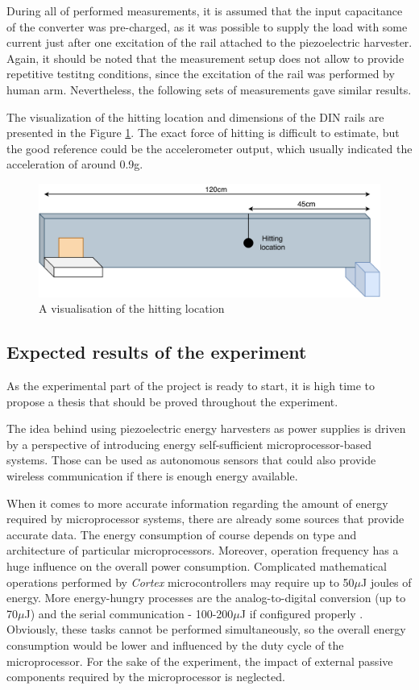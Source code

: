 \documentclass[12pt,a4paper]{article}
\begin{document}
During all of performed measurements, it is assumed that the input capacitance of the converter was pre-charged, as it was possible to supply the load with some current just after one excitation of the rail attached to the piezoelectric harvester. Again, it should be noted that the measurement setup does not allow to provide repetitive testitng conditions, since the excitation of the rail was performed by human arm. Nevertheless, the following sets of measurements gave similar results.
\par
The visualization of the hitting location and dimensions of the DIN rails are presented in the Figure \ref{fig:dinrail}. The exact force of hitting is difficult to estimate, but the good reference could be the accelerometer output, which usually indicated the acceleration of around 0.9g.

\begin{figure}[ht!]
\includegraphics[scale=0.55]{dinrail.pdf}
\caption{A visualisation of the hitting location}
\label{fig:dinrail}
\end{figure}

\subsection{Expected results of the experiment}
As the experimental part of the project is ready to start, it is high time to propose a thesis that should be proved throughout the experiment.
\par
The idea behind using piezoelectric energy harvesters as power supplies is driven by a perspective of introducing energy self-sufficient microprocessor-based systems. Those can be used as autonomous sensors that could also provide wireless communication if there is enough energy available.
\par
When it comes to more accurate information regarding the amount of energy required by microprocessor systems, there are already some sources \cite{joules} that provide accurate data. The energy consumption of course depends on type and architecture of particular microprocessors. Moreover, operation frequency has a huge influence on the overall power consumption. Complicated mathematical operations performed by \textit{Cortex} microcontrollers may require up to 50$\mu$J joules of energy. More energy-hungry processes are the analog-to-digital conversion (up to 70$\mu$J) and the serial communication - 100-200$\mu$J if configured properly \cite{joules}.
Obviously, these tasks cannot be performed simultaneously, so the overall energy consumption would be lower and influenced by the duty cycle of the microprocessor. For the sake of the experiment, the impact of external passive components required by the microprocessor is neglected.
\end{document}
